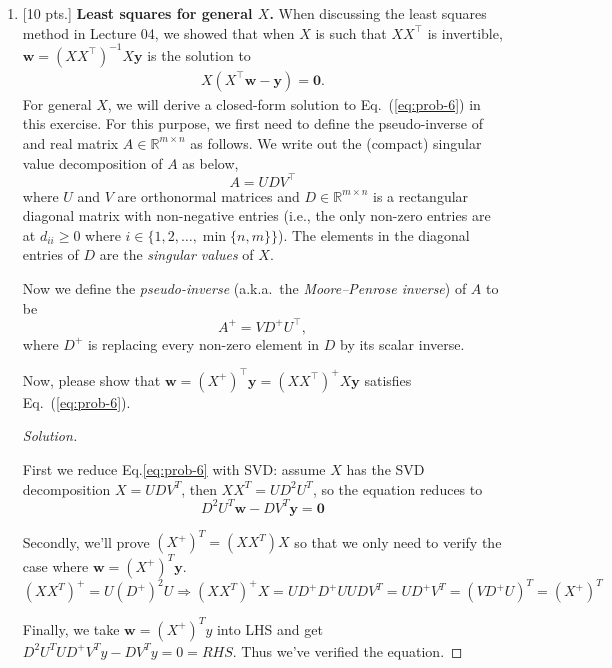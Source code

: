 \documentclass[12pt,letterpaper]{article}
\newenvironment{solution}{%
  \begin{proof}[Solution]$ $\par\nobreak\ignorespaces
}{%
  \end{proof}
}
\begin{document}
\begin{enumerate}
\item {[10 pts.]} {\bf Least squares for general $X$.} When discussing the least squares method in Lecture 04, we showed that when $X$ is such that $XX^\top$ is invertible, $\bm{w} = (XX^\top)^{-1} X\bm{y}$ is the solution to 
\begin{align}
 X (X^\top \bm{w} - \bm{y}) = \bm{0}. \label{eq:prob-6}
\end{align}
For general $X$, we will derive a closed-form solution to Eq.~(\ref{eq:prob-6}) in this exercise. For this purpose, we first need to define the pseudo-inverse of and real matrix $A \in \mathbb{R}^{m\times n}$ as follows. We write out the (compact) singular value decomposition of $A$ as below,
\[
A = U D V^\top
\]
where $U$ and $V$ are orthonormal matrices and $D\in \mathbb{R}^{m \times n}$ is a rectangular diagonal matrix  with non-negative entries (i.e., the only non-zero entries are at $d_{ii} \geq 0$ where $i \in \{1, 2, \dots, \min\{n, m\}\}$). The elements in the diagonal entries of $D$ are the \emph{singular values} of $X$.

Now we define the \emph{pseudo-inverse} (a.k.a.~the \emph{Moore–Penrose inverse}) of $A$ to be 
\[
A^+ = V D^{+} U^\top,
\]
where $D^+$ is replacing every non-zero element in $D$ by its scalar inverse.

Now, please show that $\bm{w} = (X^+)^\top \bm{y} = (XX^\top)^+ X\bm{y}$ satisfies Eq.~(\ref{eq:prob-6}).

\begin{solution}
  First we reduce Eq.\ref{eq:prob-6} with SVD: assume $X$ has the SVD decomposition $X=UDV^{T}$, then $XX^{T}=UD^{2}U^{T}$, so the equation reduces to
  \[D^{2}U^{T}\bm{w}-DV^{T}\bm{y}=\bm{0}\]

  Secondly, we'll prove $(X^{+})^{T}=(XX^{T})X$ so that we only need to verify the case where $\bm{w}=(X^{+})^{T}\bm{y}$. $(XX^{T})^{+}=U(D^{+})^{2}U\Rightarrow (XX^{T})^{+}X=UD^{+}D^{+}UUDV^{T}=UD^{+}V^{T}=(VD^{+}U)^{T}=(X^{+})^{T}$

  Finally, we take $\bm{w}=(X^{+})^{T}y$ into LHS and get $D^{2}U^{T}UD^{+}V^{T}y-DV^{T}y=0=RHS$. Thus we've verified the equation.
\end{solution}


\end{enumerate}
\end{document}
